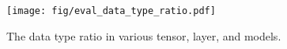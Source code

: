 \begin{figure}[t] 
    \centering 
    \texttt{[image: fig/eval\_data\_type\_ratio.pdf]}  
    \caption{The data type ratio in various tensor, layer, and models.}
    \label{fig:data_ratio}
  \end{figure}